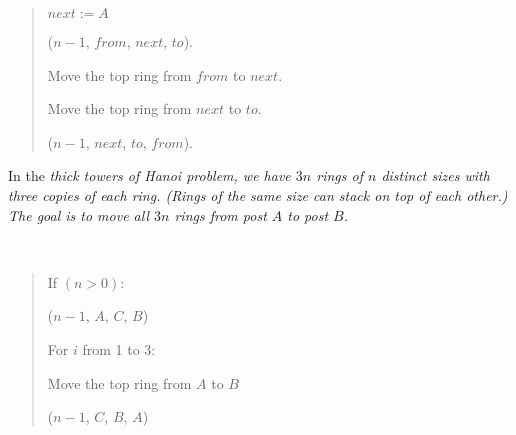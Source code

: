 \documentclass[10pt]{article}
\begin{document}
\begin{solution}
\begin{quote}
\begin{steps}
\begin{steps}
          \begin{steps}
          \item \(next := A\)
          \end{steps}
      \item {}(\( n - 1 \), \( from \), \( next \), \( to \)).
      \item Move the top ring from \( from \) to \( next \).
      \item Move the top ring from \( next \) to \( to \).
      \item {}(\( n - 1 \), \( next \), \( to \), \( from \)).
      \end{steps}
    \end{steps}
  \end{quote}
\end{solution}
\pagebreak

In the \it{thick towers of Hanoi} problem, we have \( 3n \) rings of \( n \) distinct sizes with three copies of each ring. (Rings of the same size can stack on top of each other.) The goal is to move all \( 3n \) rings from post \( A \) to post \( B \).

\begin{solution}\ %
\begin{quote}
\noindent\ul{}%

%

\begin{steps}
  \item If \( (n > 0) \):
  \begin{steps}
    \item {}(\( n-1 \), \( A \), \( C \), \( B \))

    \item For \( i \) from 1 to 3:
    \begin{steps}
      \item Move the top ring from \( A \) to \( B \)
    \end{steps}
    \item {}(\( n-1 \), \( C \), \( B \), \( A \))
  \end{steps}
\end{steps}
\end{quote}
\end{solution}
\pagebreak
\end{document}
